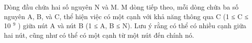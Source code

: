Dòng đầu chứa hai số nguyên N và M. M dòng tiếp theo, mỗi dòng chứa ba số nguyên A, B, và C, thể hiện việc có một cạnh với khả năng thông qua C (1 ≤ C ≤ 10   $^    9   $   ) giữa nút A và nút B (1 ≤ A, B ≤ N). Lưu ý rằng có thể có nhiều cạnh giữa hai nút, cũng như có thể có một cạnh từ một nút đến chính nó.